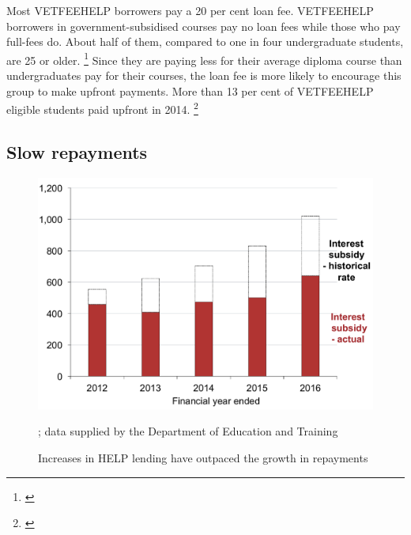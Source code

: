 \documentclass[embargoed]{grattan}
\begin{document}
Most \gls{VETFEEHELP} borrowers pay a 20 per cent loan fee.
\gls{VETFEEHELP} borrowers in government-subsidised courses pay no loan fees while those who pay full-fees do.
About half of them, compared to one in four undergraduate students, are 25 or older.%
\footnote{\textcites[][table 1]{Education20152014VETFEEa}[][table 2.1]{Education2015StudentsSelectedhigher}} Since they are paying less for their average diploma course than undergraduates pay for their courses, the loan fee is more likely to encourage this group to make upfront payments.
More than 13 per cent of \gls{VETFEEHELP} eligible students paid upfront in 2014.%
\footnote{\textcite{Education2014VETFEEHELP}}

\subsection{Slow repayments }\label{slow-repayments}

\begin{figure}
\caption{Increases in \gls{HELP} lending have outpaced the growth in repayments}\label{fig:fig7-increases-help-lending-outpaced-growth-repayments}


\includegraphics[page=7]{atlas/Chartpack.pdf}

%
{\textcites{Education2015Highereducationreport}{Education20152014VETFEEa}; data supplied by the Department of Education and Training}
\end{figure}
\end{document}
